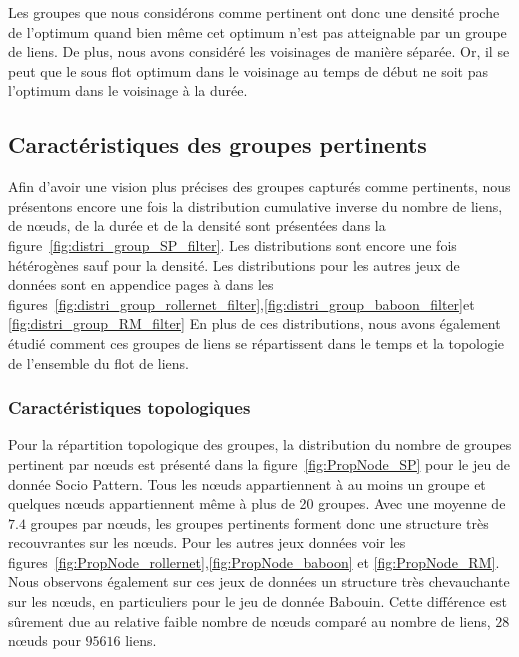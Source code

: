 Les groupes que nous considérons comme pertinent ont donc une densité proche de l'optimum quand bien même cet optimum n'est pas atteignable par un groupe de liens.
De plus, nous avons considéré les voisinages de manière séparée.
Or, il se peut que le sous flot optimum dans le voisinage au temps de début ne soit pas l'optimum dans le voisinage à la durée.


\subsection{Caractéristiques des groupes pertinents}

Afin d'avoir une vision plus précises des groupes capturés comme pertinents, nous présentons encore une fois la distribution cumulative inverse du nombre de liens, de n\oe uds, de la durée et de la densité sont présentées dans la figure~\ref{fig:distri_group_SP_filter}.
Les distributions sont encore une fois hétérogènes sauf pour la densité.
Les distributions pour les autres jeux de données sont en appendice pages \pageref{fig:distri_group_rollernet_filter} à \pageref{fig:distri_group_RM_filter} dans les figures~\ref{fig:distri_group_rollernet_filter},\ref{fig:distri_group_baboon_filter}et \ref{fig:distri_group_RM_filter}
En plus de ces distributions, nous avons également étudié comment ces groupes de liens se répartissent dans le temps et la topologie de l'ensemble du flot de liens.

\subsubsection{Caractéristiques topologiques}
Pour la répartition topologique des groupes, la distribution du nombre de groupes pertinent par n\oe uds est présenté dans la figure~\ref{fig:PropNode_SP} pour le jeu de donnée Socio Pattern.
Tous les n\oe uds appartiennent à au moins un groupe et quelques n\oe uds appartiennent même à plus de 20 groupes.
Avec une moyenne de $7.4$ groupes par n\oe uds, les groupes pertinents forment donc une structure très recouvrantes sur les n\oe uds.
Pour les autres jeux données voir les figures~\ref{fig:PropNode_rollernet},\ref{fig:PropNode_baboon} et \ref{fig:PropNode_RM}.
Nous observons également sur ces jeux de données un structure très chevauchante sur les n\oe uds, en particuliers pour le jeu de donnée Babouin.
Cette différence est sûrement due au relative faible nombre de n\oe uds comparé au nombre de liens, $28$ n\oe uds pour $95616$ liens.

